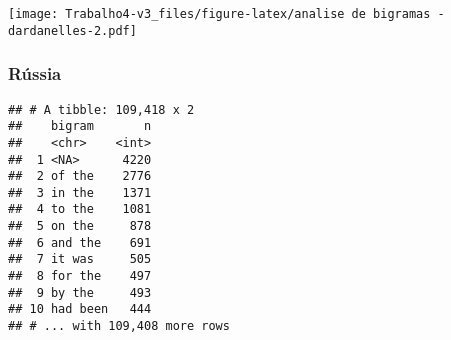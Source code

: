 \documentclass[]{article}
\newenvironment{Shaded}{\begin{snugshade}}{\end{snugshade}}
\newcommand{\DataTypeTok}[1]{\textcolor[rgb]{0.13,0.29,0.53}{#1}}
\newcommand{\DecValTok}[1]{\textcolor[rgb]{0.00,0.00,0.81}{#1}}
\newcommand{\KeywordTok}[1]{\textcolor[rgb]{0.13,0.29,0.53}{\textbf{#1}}}
\newcommand{\NormalTok}[1]{#1}
\newcommand{\OperatorTok}[1]{\textcolor[rgb]{0.81,0.36,0.00}{\textbf{#1}}}
\newcommand{\OtherTok}[1]{\textcolor[rgb]{0.56,0.35,0.01}{#1}}
\newcommand{\StringTok}[1]{\textcolor[rgb]{0.31,0.60,0.02}{#1}}
\begin{document}
\texttt{[image: Trabalho4-v3\_files/figure-latex/analise de bigramas - dardanelles-2.pdf]}

\hypertarget{russia-3}{%
\subsubsection{Rússia}\label{russia-3}}

\begin{Shaded}
\end{Shaded}

\begin{verbatim}
## # A tibble: 109,418 x 2
##    bigram       n
##    <chr>    <int>
##  1 <NA>      4220
##  2 of the    2776
##  3 in the    1371
##  4 to the    1081
##  5 on the     878
##  6 and the    691
##  7 it was     505
##  8 for the    497
##  9 by the     493
## 10 had been   444
## # ... with 109,408 more rows
\end{verbatim}
\end{document}
